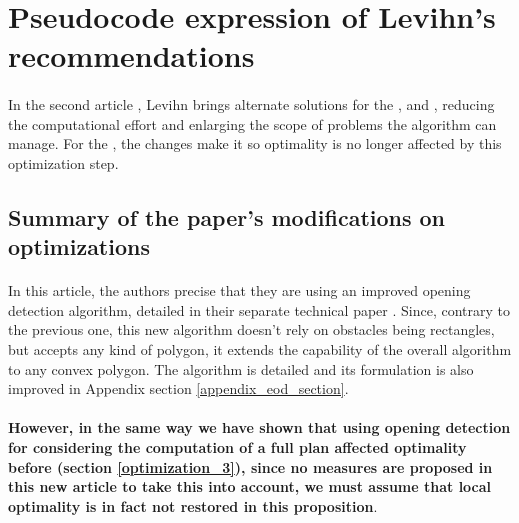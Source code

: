 \section{Pseudocode expression of Levihn's recommendations} \label{levihn_pseudocode_section}

\paragraph{} In the second article \parencite{levihn_locally_2014}, Levihn brings alternate solutions for the ,  and , reducing the computational effort and enlarging the scope of problems the algorithm can manage. For the , the changes make it so optimality is no longer affected by this optimization step.

\subsection{Summary of the paper's modifications on optimizations}

\paragraph{} In this article, the authors precise that they are using an improved opening detection algorithm, detailed in their separate technical paper \parencite{levihn_efficient_2011}. Since, contrary to the previous one, this new algorithm doesn't rely on obstacles being rectangles, but accepts any kind of polygon, it extends the capability of the overall algorithm to any convex polygon. The algorithm is detailed and its formulation is also improved in Appendix section \ref{appendix_eod_section}.

\paragraph{} \textbf{However, in the same way we have shown that using opening detection for considering the computation of a full plan affected optimality before (section \ref{optimization_3}), since no measures are proposed in this new article to take this into account, we must assume that local optimality is in fact not restored in this proposition}.


